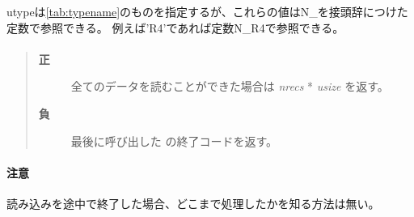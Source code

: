 utypeは\ref{tab:typename}のものを指定するが、これらの値はN\_を接頭辞につけた定数で参照できる。
例えば'R4'であれば定数N\_R4で参照できる。

\paragraph{\ResultCode}
\begin{quote}
\begin{description}
\item[{\bf 正}] 全てのデータを読むことができた場合は {\it nrecs} * {\it usize} を返す。
\item[{\bf 負}] 最後に呼び出した  の終了コードを返す。
\end{description}\end{quote}

\paragraph{ 注意 }
読み込みを途中で終了した場合、どこまで処理したかを知る方法は無い。

